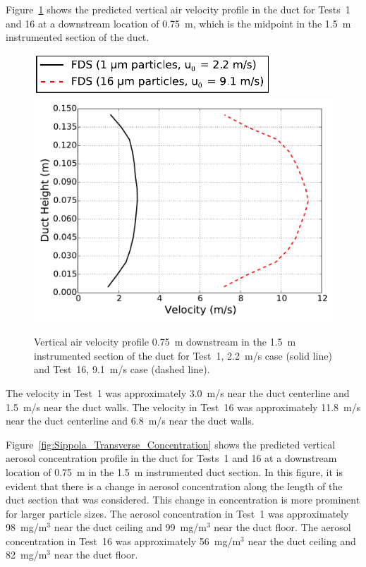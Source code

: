 \noindent Figure~\ref{fig:Sippola_Transverse_Velocity} shows the predicted vertical air velocity profile in the duct for Tests~1 and 16 at a downstream location of 0.75~m, which is the midpoint in the 1.5~m instrumented section of the duct.

\begin{figure}[!ht]
\includegraphics[width=3.5in]{Fig_Sippola_Aerosol_Deposition_Transverse_Legend.pdf}
\includegraphics[width=5.0in]{Fig_Sippola_Aerosol_Deposition_Transverse_Velocity.pdf}
\caption[Vertical air velocity profile]
{Vertical air velocity profile 0.75~m downstream in the 1.5~m instrumented section of the duct for Test~1, 2.2~m/s case (solid line) and Test~16, 9.1~m/s case (dashed line).}
\label{fig:Sippola_Transverse_Velocity}
\end{figure}

The velocity in Test~1 was approximately 3.0~m/s near the duct centerline and 1.5~m/s near the duct walls. The velocity in Test~16 was approximately 11.8~m/s near the duct centerline and 6.8~m/s near the duct walls.

\noindent Figure~\ref{fig:Sippola_Transverse_Concentration} shows the predicted vertical aerosol concentration profile in the duct for Tests~1 and 16 at a downstream location of 0.75~m in the 1.5~m instrumented duct section. In this figure, it is evident that there is a change in aerosol concentration along the length of the duct section that was considered. This change in concentration is more prominent for larger particle sizes. The aerosol concentration in Test~1 was approximately 98~mg/m$^3$ near the duct ceiling and 99~mg/m$^3$ near the duct floor. The aerosol concentration in Test~16 was approximately 56~mg/m$^3$ near the duct ceiling and 82~mg/m$^3$ near the duct floor.

